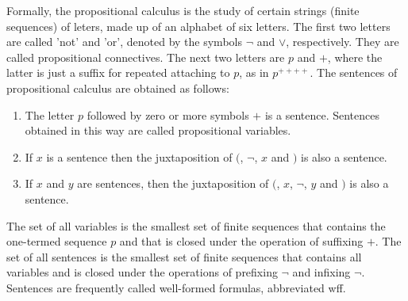 \documentclass[letterpaper, 10pt]{article}
\begin{document}
Formally, the propositional calculus is the study of certain strings (finite
sequences) of leters, made up of an alphabet of six letters. The first two
letters are called 'not' and 'or', denoted by the symbols $\neg$ and $\lor$,
respectively. They are called propositional connectives. The next two letters
are $p$ and $+$, where the latter is just a suffix for repeated attaching to
$p$, as in $p^{++++}$.
The sentences of propositional calculus are obtained as follows:
\begin{enumerate}
	\item The letter $p$ followed by zero or more symbols $+$ is a sentence.
		Sentences obtained in this way are called propositional variables.
	\item If $x$ is a sentence then the juxtaposition of $($, $\neg$, $x$ and
		$)$ is also
		a sentence.
	\item If $x$ and $y$ are sentences, then the juxtaposition of $($, $x$,
$\lnot$, $y$ and $)$ is also a sentence.  
\end{enumerate}

The set of all variables is the smallest set of finite sequences that contains
the one-termed sequence $p$ and that is closed under the operation of suffixing
$+$. The set of all sentences is the smallest set of finite sequences that
contains all variables and is closed under the operations of prefixing $\neg$
and infixing $\lnot$. Sentences are frequently called well-formed formulas,
abbreviated wff.
\end{document}
